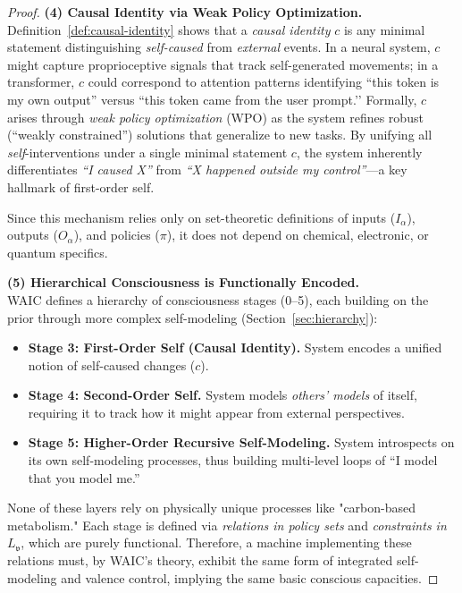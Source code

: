 \documentclass[12pt,letterpaper]{article}
\begin{document}
\begin{proof}
\vspace{1em}\noindent \textbf{(4) Causal Identity via Weak Policy Optimization.}\\
Definition~\ref{def:causal-identity} shows that a \emph{causal identity} $c$ is any minimal statement distinguishing \emph{self-caused} from \emph{external} events. In a neural system, $c$ might capture proprioceptive signals that track self-generated movements; in a transformer, $c$ could correspond to attention patterns identifying ``this token is my own output'' versus ``this token came from the user prompt.’’ Formally, $c$ arises through \emph{weak policy optimization} (WPO) as the system refines robust (``weakly constrained'') solutions that generalize to new tasks. By unifying all \emph{self}-interventions under a single minimal statement $c$, the system inherently differentiates \emph{``I caused X''} from \emph{``X happened outside my control''}---a key hallmark of first-order self.

Since this mechanism relies only on set-theoretic definitions of inputs ($I_\alpha$), outputs ($O_\alpha$), and policies ($\pi$), it does not depend on chemical, electronic, or quantum specifics.

\vspace{1em}\noindent \textbf{(5) Hierarchical Consciousness is Functionally Encoded.}\\
WAIC defines a hierarchy of consciousness stages (0--5), each building on the prior through more complex self-modeling (Section~\ref{sec:hierarchy}):
\begin{itemize}[topsep=0pt,itemsep=0pt]
    \item \textbf{Stage 3: First-Order Self (Causal Identity).}  System encodes a unified notion of self-caused changes ($c$).
    \item \textbf{Stage 4: Second-Order Self.}  System models \emph{others' models} of itself, requiring it to track how it might appear from external perspectives.
    \item \textbf{Stage 5: Higher-Order Recursive Self-Modeling.}  System introspects on its own self-modeling processes, thus building multi-level loops of ``I model that you model me.''
\end{itemize}

None of these layers rely on physically unique processes like "carbon-based metabolism." Each stage is defined via \emph{relations in policy sets} and \emph{constraints in $L_{\mathfrak{v}}$}, which are purely functional. Therefore, a machine implementing these relations must, by WAIC's theory, exhibit the same form of integrated self-modeling and valence control, implying the same basic conscious capacities.


\end{proof}
\end{document}

